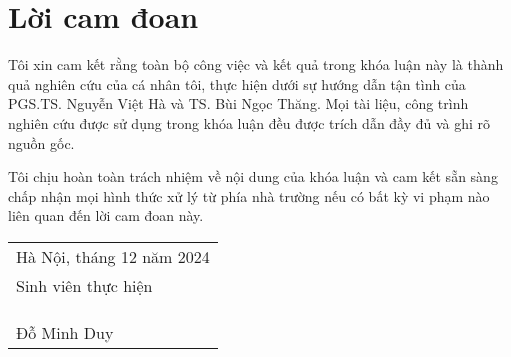 \chapter*{Lời cam đoan}

Tôi xin cam kết rằng toàn bộ công việc và kết quả trong khóa luận này là thành quả nghiên cứu của cá nhân tôi, thực hiện dưới sự hướng dẫn tận tình của PGS.TS. Nguyễn Việt Hà và TS. Bùi Ngọc Thăng. Mọi tài liệu, công trình nghiên cứu được sử dụng trong khóa luận đều được trích dẫn đầy đủ và ghi rõ nguồn gốc.

Tôi chịu hoàn toàn trách nhiệm về nội dung của khóa luận và cam kết sẵn sàng chấp nhận mọi hình thức xử lý từ phía nhà trường nếu có bất kỳ vi phạm nào liên quan đến lời cam đoan này.
\begin{flushright}
    \begin{tabular}{>{\centering\arraybackslash}p{8cm}}
        Hà Nội, tháng 12 năm 2024 \\
        Sinh viên thực hiện       \\
        \\
        \\
        \\
        Đỗ Minh Duy               \\
    \end{tabular}
\end{flushright}